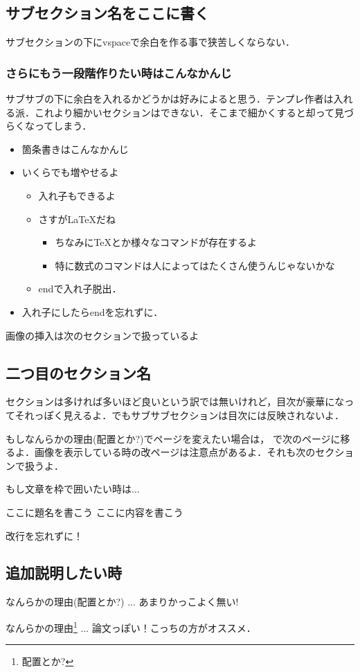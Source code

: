 \subsection{サブセクション名をここに書く}

サブセクションの下にvspaceで余白を作る事で狭苦しくならない．
\subsubsection{さらにもう一段階作りたい時はこんなかんじ}
サブサブの下に余白を入れるかどうかは好みによると思う．テンプレ作者は入れる派．これより細かいセクションはできない．そこまで細かくすると却って見づらくなってしまう．

\begin{itemize}
 \item 箇条書きはこんなかんじ
 \item いくらでも増やせるよ
       \begin{itemize}
	\item 入れ子もできるよ
	\item さすが\LaTeX だね
	      \begin{itemize}
	       \item ちなみに\TeX とか様々なコマンドが存在するよ
	       \item 特に数式のコマンドは人によってはたくさん使うんじゃないかな
	      \end{itemize}
	\item endで入れ子脱出．
       \end{itemize}
 \item 入れ子にしたらendを忘れずに．
\end{itemize}
画像の挿入は次のセクションで扱っているよ

\subsection{二つ目のセクション名}
セクションは多ければ多いほど良いという訳では無いけれど，目次が豪華になってそれっぽく見えるよ．でもサブサブセクションは目次には反映されないよ．

もしなんらかの理由(配置とか?)でページを変えたい場合は，
\newpage
で次のページに移るよ．画像を表示している時の改ページは注意点があるよ．それも次のセクションで扱うよ．
\par \vspace{5pt}
もし文章を枠で囲いたい時は...
\vspace{5pt}
\begin{itembox}[l]{ここに題名を書こう}
ここに内容を書こう
\end{itembox}
\par \vspace{5pt}
改行を忘れずに！

\subsection{追加説明したい時}
なんらかの理由(配置とか?) ... あまりかっこよく無い!

なんらかの理由\footnote{配置とか?} ... 論文っぽい！こっちの方がオススメ．